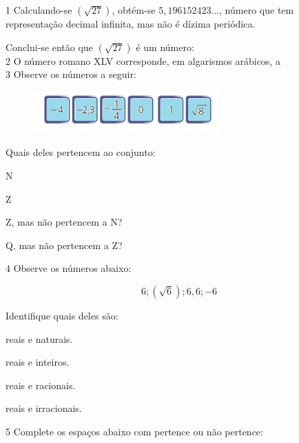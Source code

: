 \num{1} Calculando-se $(\sqrt{27})$, obtém-se $5,196152423$..., número que tem
representação decimal infinita, mas não é dízima periódica.

Conclui-se então que $(\sqrt{27})$ é um número:
\\


\num{2} O número romano XLV corresponde, em algarismos arábicos, a
\\

\num{3} Observe os números a seguir:

\begin{figure}[H]
\centering\includegraphics[width=2.79167in,height=0.63542in]{./imgSAEB_8_MAT/media/image1.png}
\end{figure}

Quais deles pertencem ao conjunto:


\begin{escolha}
\item N 
\item Z 
\item Z, mas não pertencem a N? 
\item Q, mas não pertencem a Z? 
\end{escolha}

\pagebreak

\num{4} Observe os números abaixo:

$$6; (\sqrt{6}); 6,6; -6$$


Identifique quais deles são:
\begin{escolha}
\item reais e naturais.
\item reais e inteiros.
\item reais e racionais.
\item reais e irracionais.
\end{escolha}


\num{5} Complete os espaços abaixo com pertence ou não pertence:



